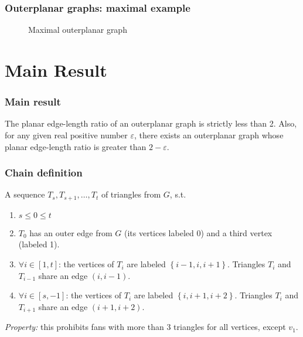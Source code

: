 \documentclass[xetex,mathserif,serif]{beamer}
\begin{document}
\begin{frame}
  \frametitle{Outerplanar graphs: maximal example}

  \begin{figure}
    \caption{Maximal outerplanar graph}
  \end{figure}
\end{frame}

\section{Main Result}

\begin{frame}
  \frametitle{Main result}
  \begin{theorem}
    The planar edge-length ratio of an outerplanar graph is strictly less than 2. Also, for any given real positive number \(\varepsilon\), there exists an outerplanar graph whose planar edge-length ratio is greater than \(2 - \varepsilon\).
    \end{theorem}
\end{frame}

\begin{frame}
  \frametitle{Chain definition}
  A sequence \(T_s, T_{s+1}, \dots, T_t\) of triangles from \(G\), s.t.
  \begin{enumerate}
  \item \(s \leq 0 \leq t\)
  \item \(T_0\) has an outer edge from \(G\) (its vertices labeled 0) and a third vertex (labeled 1).
  \item \(\forall i\in [1, t]\): the vertices of \(T_i\) are labeled \(\left\{i - 1, i, i + 1\right\}\). Triangles \(T_i\) and \(T_{i - 1}\) share an edge \((i, i - 1)\).
  \item \(\forall i\in [s, -1]\): the vertices of \(T_i\) are labeled \(\left\{i, i + 1, i + 2\right\}\). Triangles \(T_i\) and \(T_{i + 1}\) share an edge \((i + 1, i + 2)\).
  \end{enumerate}

  \pause
  \emph{Property:} this prohibits fans with more than 3 triangles for all vertices, except \(v_1\).
\end{frame}
\end{document}
